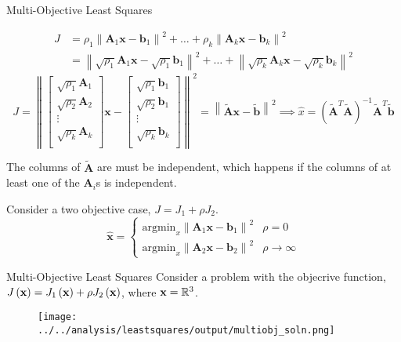 \documentclass[aspectratio=169]{beamer}
\def\mf{\ensuremath\mathbf}
\def\mb{\ensuremath\mathbb}
\def\lp{\ensuremath\left(}
\def\rp{\ensuremath\right)}
\newcommand{\ct}[1]{\lp #1\rp}
\begin{document}
\begin{frame}[t]{Multi-Objective Least Squares}
\begin{small}
    \[ \begin{split}
    J & = \rho_1\left\lVert \mathbf{A}_1\mathbf{x} - \mathbf{b}_1 \right\rVert^2 + \ldots + \rho_k\left\lVert \mathbf{A}_k\mathbf{x} - \mathbf{b}_k \right\rVert^2 \\
     & = \left\lVert \sqrt{\rho_1}\mathbf{A}_1\mathbf{x} - \sqrt{\rho_1}\mathbf{b}_1 \right\rVert^2 + \ldots + \left\lVert \sqrt{\rho_k}\mathbf{A}_k\mathbf{x} - \sqrt{\rho_k}\mathbf{b}_k \right\rVert^2
    \end{split}
    \]
    \[ J = \left\lVert 
    \begin{bmatrix*}\sqrt{\rho_1}\mathbf{A}_1\\\sqrt{\rho_2}\mathbf{A}_2\\\vdots\\\sqrt{\rho_k}\mathbf{A}_k\\\end{bmatrix*}\mathbf{x} - \begin{bmatrix*}\sqrt{\rho_1}\mathbf{b}_1\\\sqrt{\rho_2}\mathbf{b}_1\\\vdots\\\sqrt{\rho_k}\mathbf{b}_k\\\end{bmatrix*}\right\rVert^2
    = \left\lVert \mathbf{\tilde{A}}\mathbf{x} - \mathbf{\tilde{b}}\right\rVert^2
    \implies \hat{x} = \left(\mathbf{\tilde{A}}^T\mathbf{\tilde{A}}\right)^{-1}\mathbf{\tilde{A}}^T\mathbf{\tilde{b}}
    \]

    The columns of $\mathbf{\tilde{A}}$ are must be independent, which happens if the columns of at least one of the $\mathbf{A}_i$s is independent.

    Consider a two objective case, $J = J_1 + \rho J_2$.
    \[ \hat{\mathbf{x}} = \begin{cases}
    \mathrm{argmin}_x \left\lVert \mathbf{A}_1\mathbf{x} - \mathbf{b}_1\right\rVert^2 & \rho = 0\\
    \mathrm{argmin}_x \left\lVert \mathbf{A}_2\mathbf{x} - \mathbf{b}_2\right\rVert^2 & \rho \rightarrow \infty 
    \end{cases}
    \]
    \end{small}
\end{frame}


\begin{frame}[t]{Multi-Objective Least Squares}
    Consider a problem with the objecrive function, $J\ct{\mf{x}} = J_1\ct{\mf{x}} + \rho J_2\ct{\mf{x}}$, where $\mf{x} = \mb{R}^3$.

    \begin{figure}
        \centering
        \texttt{[image: ../../analysis/leastsquares/output/multiobj\_soln.png]}
    \end{figure}
\end{frame}
\end{document}
